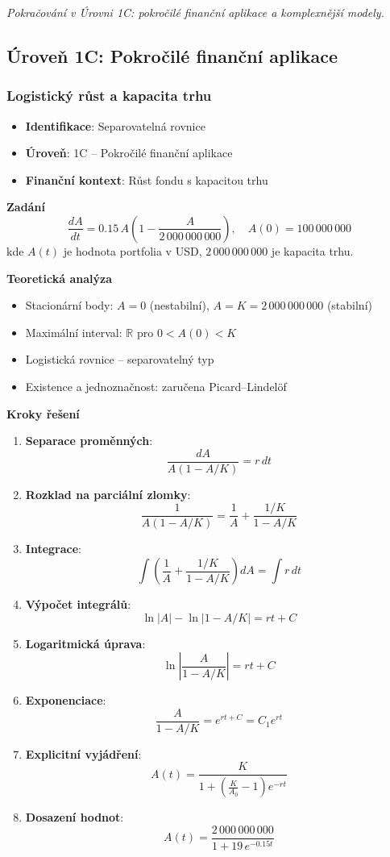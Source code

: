 \emph{Pokračování v Úrovni 1C: pokročilé finanční aplikace a komplexnější modely.}

\subsection{Úroveň 1C: Pokročilé finanční aplikace}
\label{sec:uroven-1c}

\subsubsection{Logistický růst a kapacita trhu}
\label{subsec:logisticky-rust}

\begin{example}
\label{ex:logisticky-rust-portfolio}

\begin{itemize}
\item \textbf{Identifikace}: Separovatelná rovnice
\item \textbf{Úroveň}: 1C -- Pokročilé finanční aplikace
\item \textbf{Finanční kontext}: Růst fondu s kapacitou trhu
\end{itemize}

\noindent\textbf{Zadání}
\[
\frac{dA}{dt} = 0.15\, A \left(1 - \frac{A}{2\,000\,000\,000}\right), \quad A(0) = 100\,000\,000
\]
kde $A(t)$ je hodnota portfolia v USD, $2\,000\,000\,000$ je kapacita trhu.

\noindent\textbf{Teoretická analýza}
\begin{itemize}
\item Stacionární body: $A = 0$ (nestabilní), $A = K = 2\,000\,000\,000$ (stabilní)
\item Maximální interval: $\mathbb{R}$ pro $0 < A(0) < K$
\item Logistická rovnice -- separovatelný typ
\item Existence a jednoznačnost: zaručena Picard--Lindelöf
\end{itemize}

\noindent\textbf{Kroky řešení}
\begin{enumerate}
\item \textbf{Separace proměnných}:
\[
\frac{dA}{A(1 - A/K)} = r\, dt
\]
\item \textbf{Rozklad na parciální zlomky}:
\[
\frac{1}{A(1 - A/K)} = \frac{1}{A} + \frac{1/K}{1 - A/K}
\]
\item \textbf{Integrace}:
\[
\int \!\left(\frac{1}{A} + \frac{1/K}{1 - A/K}\right) dA = \int r\, dt
\]
\item \textbf{Výpočet integrálů}:
\[
\ln|A| - \ln|1 - A/K| = rt + C
\]
\item \textbf{Logaritmická úprava}:
\[
\ln\!\left|\frac{A}{1 - A/K}\right| = rt + C
\]
\item \textbf{Exponenciace}:
\[
\frac{A}{1 - A/K} = e^{rt + C} = C_1 e^{rt}
\]
\item \textbf{Explicitní vyjádření}:
\[
A(t) = \frac{K}{1 + \left(\frac{K}{A_0} - 1\right) e^{-rt}}
\]
\item \textbf{Dosazení hodnot}:
\[
A(t) = \frac{2\,000\,000\,000}{1 + 19\, e^{-0.15 t}}
\]
\end{enumerate}


\end{example}
